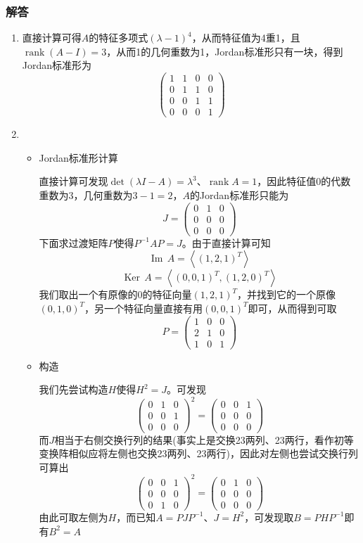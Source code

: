 \documentclass[a4paper,UTF8,fontset=windows,AutoFakeBold]{ctexart}
\DeclareMathOperator{\rank}{rank}
\DeclareMathOperator{\im}{Im\,}
\DeclareMathOperator{\Ker}{Ker\,}
\begin{document}
\subsubsection{解答}
\begin{enumerate}
    \item 直接计算可得$A$的特征多项式$(\lambda-1)^4$，从而特征值为4重1，且$\rank(A-I)=3$，从而1的几何重数为1，Jordan标准形只有一块，得到Jordan标准形为
    $$\begin{pmatrix}1&1&0&0\\0&1&1&0\\0&0&1&1\\0&0&0&1\end{pmatrix}$$

    \item
    \begin{itemize}
        \item Jordan标准形计算
        
        直接计算可发现$\det(\lambda I-A)=\lambda^3$、$\rank A=1$，因此特征值0的代数重数为3，几何重数为$3-1=2$，$A$的Jordan标准形只能为
        $$J=\begin{pmatrix}0&1&0\\0&0&0\\0&0&0\end{pmatrix}$$
        下面求过渡矩阵$P$使得$P^{-1}AP=J$。由于直接计算可知
        $$\im A=\left<(1,2,1)^T\right>$$
        $$\Ker A=\left<(0,0,1)^T,(1,2,0)^T\right>$$
        我们取出一个有原像的0的特征向量$(1,2,1)^T$，并找到它的一个原像$(0,1,0)^T$，另一个特征向量直接有用$(0,0,1)^T$即可，从而得到可取
        $$P=\begin{pmatrix}1&0&0\\2&1&0\\1&0&1\end{pmatrix}$$

        \item 构造
        
        我们先尝试构造$H$使得$H^2=J$。可发现
        $$\begin{pmatrix}0&1&0\\0&0&1\\0&0&0\end{pmatrix}^2=\begin{pmatrix}0&0&1\\0&0&0\\0&0&0\end{pmatrix}$$
        而$J$相当于右侧交换行列的结果(事实上是交换23两列、23两行，看作初等变换阵相似应将左侧也交换23两列、23两行)，因此对左侧也尝试交换行列可算出
        $$\begin{pmatrix}0&0&1\\0&0&0\\0&1&0\end{pmatrix}^2=\begin{pmatrix}0&1&0\\0&0&0\\0&0&0\end{pmatrix}$$
        由此可取左侧为$H$，而已知$A=PJP^{-1}$、$J=H^2$，可发现取$B=PHP^{-1}$即有$B^2=A$


\end{itemize}
\end{enumerate}
\end{document}
